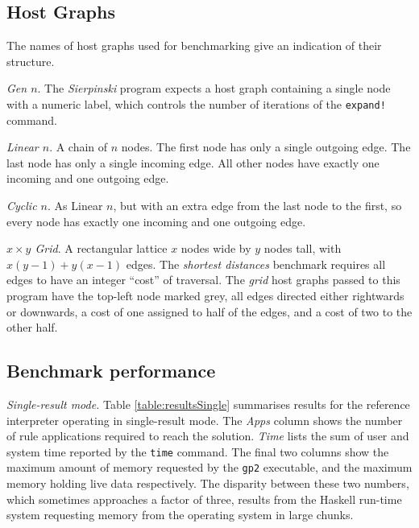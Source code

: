 \subsection{Host Graphs}
\label{subsec:hosts}

The names of host graphs used for benchmarking give an indication of their structure.

\vspace{.5\baselineskip}
\noindent
\emph{Gen $n$}. The \textit{Sierpinski} program expects a host graph containing a single node with a numeric label, which controls the number of iterations of the \texttt{expand!} command.

\vspace{.5\baselineskip}
\noindent
\emph{Linear $n$}. A chain of $n$ nodes. The first node has only a single outgoing edge. The last node has only a single incoming edge. All other nodes have exactly one incoming and one outgoing edge.

\vspace{.5\baselineskip}
\noindent
\emph{Cyclic $n$}. As Linear $n$, but with an extra edge from the last node to the first, so every node has exactly one incoming and one outgoing edge.

\vspace{.5\baselineskip}
\noindent
\emph{$x \times y$ Grid}. A rectangular lattice $x$ nodes wide by $y$ nodes tall, with $x(y-1) + y(x-1)$ edges. The \textit{shortest distances} benchmark requires all edges to have an integer ``cost'' of traversal. The \textit{grid} host graphs passed to this program have the top-left node marked grey, all edges directed either rightwards or downwards, a cost of one assigned to half of the edges, and a cost of two to the other half.

\subsection{Benchmark performance}\label{sec:benchperf}


\vspace{.5\baselineskip}
\noindent
\emph{Single-result mode.}
Table \ref{table:resultsSingle} summarises results for the reference interpreter operating in single-result mode. The \textit{Apps} column shows the number of rule applications required to reach the solution. \textit{Time} lists the sum of user and system time reported by the \texttt{time} command. The final two columns show the maximum amount of memory requested by the \texttt{gp2} executable, and the maximum memory holding live data respectively. The disparity between these two numbers, which sometimes approaches a factor of three, results from the Haskell run-time system requesting memory from the operating system in large chunks.

